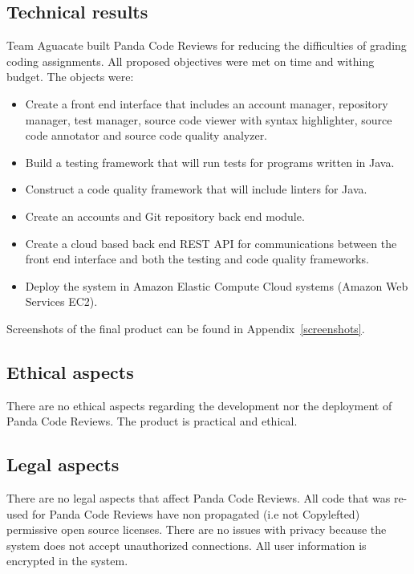 \subsection{Technical results}
Team Aguacate built Panda Code Reviews for reducing the difficulties of grading coding
assignments. All proposed objectives were met on time and withing budget. The objects were:

\begin{itemize}
\item Create a front end interface that includes an account manager, repository
manager, test manager, source code viewer with syntax highlighter, source code
annotator and source code quality analyzer.

\item Build a testing framework that will run tests for programs written in
Java.

\item Construct a code quality framework that will include linters for Java.

\item Create an accounts and Git repository back end module.

\item Create a cloud based back end REST API for communications between the
front end interface and both the testing and code quality frameworks.

\item Deploy the system in Amazon Elastic Compute Cloud systems (Amazon Web
Services EC2).

\end{itemize}

Screenshots of the final product can be found in Appendix~\ref{screenshots}.

\subsection{Ethical aspects}
There are no ethical aspects regarding the development nor the deployment of Panda Code Reviews. The product is practical and ethical.

\subsection{Legal aspects}
There are no legal aspects that affect Panda Code Reviews. All code that was re-used for
Panda Code Reviews have non propagated (i.e not Copylefted) permissive open source licenses.
There are no issues with privacy because the system does not accept unauthorized connections. All user information is encrypted in the system.

